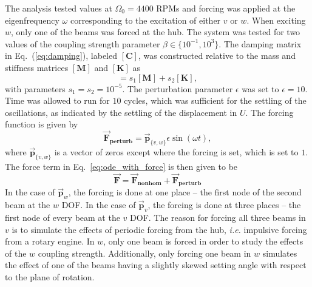 The analysis tested values at $\Omega_0 = 4400$ RPMs and forcing was applied at the eigenfrequency $\omega$ corresponding to the excitation of either $v$ or $w$. When exciting $w$, only one of the beams was forced at the hub. The system was tested for two values of the coupling strength parameter $\beta\in\{10^{-1},10^3\}$. The damping matrix in Eq.~(\ref{eq:damping}), labeled $[\mathbf{C}]$, was constructed relative to the mass and stiffness matrices $[\mathbf{M}]$ and $[\mathbf{K}]$ as
\begin{equation}
[\mathbf{C}] = s_1[\mathbf{M}]+s_2[\mathbf{K}],
\end{equation}
with parameters $s_1=s_2=10^{-5}$. The perturbation parameter $\epsilon$ was set to $\epsilon=10$. Time was allowed to run for $10$ cycles, which was sufficient for the settling of the oscillations, as indicated by the settling of the displacement in $U$. The forcing function is given by 
\begin{equation}
\vec{\mathbf{F}}_{\textbf{perturb}}=\vec{\mathbf{p}}_{\{v,w\}}\epsilon\sin(\omega t),
\end{equation}
where $\vec{\mathbf{p}}_{\{v,w\}}$ is a vector of zeros except where the forcing is set, which is set to $1$. The force term in Eq.~\ref{eq:ode_with_force} is then given to be
\begin{equation}
\vec{\mathbf{F}} = \vec{\mathbf{F}}_{\textbf{nonhom}}+\vec{\mathbf{F}}_{\textbf{perturb}}
\end{equation}
In the case of $\vec{\mathbf{p}}_{w}$, the forcing is done at one place -- the first node of the second beam at the $w$ DOF. In the case of $\vec{\mathbf{p}}_{v}$, the forcing is done at three places -- the first node of every beam at the $v$ DOF. The reason for forcing all three beams in $v$ is to simulate the effects of periodic forcing from the hub, \emph{i.e.} impulsive forcing from a rotary engine. In $w$, only one beam is forced in order to study the effects of the $w$ coupling strength. Additionally, only forcing one beam in $w$ simulates the effect of one of the beams having a slightly skewed setting angle with respect to the plane of rotation.

